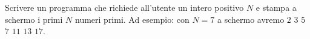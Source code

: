 \begin{Exercise}[label={ex:primi}]
  Scrivere un programma che richiede all'utente un intero positivo $N$ e stampa a schermo i primi $N$ numeri primi. Ad esempio: con $N = 7$ a schermo avremo $2$ $3$ $5$ $7$ $11$ $13$ $17$.
\end{Exercise}

\begin{Answer}[ref={ex:primi}]
  
\end{Answer}